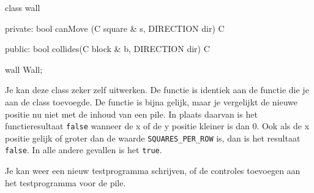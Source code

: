 \begin{code}
class wall
{
private:
   bool canMove (C square & s, DIRECTION dir) C {}
   
public:  
   bool collides(C block  & b, DIRECTION dir) C {}
}

wall Wall;
\end{code}

Je kan deze class zeker zelf uitwerken. De functie  is identiek aan de functie die je aan de class  toevoegde. De functie  is bijna gelijk, maar je vergelijkt de nieuwe positie nu niet met de inhoud van een pile. In plaats daarvan is het functieresultaat \verb|false| wanneer de x of de y positie kleiner is dan 0. Ook als de x positie gelijk of groter dan de waarde \verb|SQUARES_PER_ROW| is, dan is het resultaat \verb|false|. In alle andere gevallen is het \verb|true|.

Je kan weer een nieuw testprogramma schrijven, of de controles toevoegen aan het testprogramma voor de pile.
